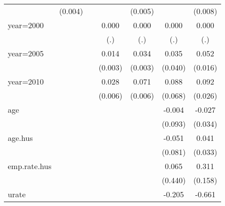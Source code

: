 \begin{table}[htbp]
\begin{tabular}{l*{6}{c}}
                    &     (0.004)         &                     &                     &     (0.005)         &                     &     (0.008)         \\
year=2000           &                     &                     &       0.000         &       0.000         &       0.000         &       0.000         \\
                    &                     &                     &         (.)         &         (.)         &         (.)         &         (.)         \\
year=2005           &                     &                     &       0.014\sym{***}&       0.034\sym{***}&       0.035         &       0.052\sym{**} \\
                    &                     &                     &     (0.003)         &     (0.003)         &     (0.040)         &     (0.016)         \\
year=2010           &                     &                     &       0.028\sym{***}&       0.071\sym{***}&       0.088         &       0.092\sym{**} \\
                    &                     &                     &     (0.006)         &     (0.006)         &     (0.068)         &     (0.026)         \\
age                 &                     &                     &                     &                     &      -0.004         &      -0.027         \\
                    &                     &                     &                     &                     &     (0.093)         &     (0.034)         \\
age.hus             &                     &                     &                     &                     &      -0.051         &       0.041         \\
                    &                     &                     &                     &                     &     (0.081)         &     (0.033)         \\
emp.rate.hus        &                     &                     &                     &                     &       0.065         &       0.311         \\
                    &                     &                     &                     &                     &     (0.440)         &     (0.158)         \\
urate               &                     &                     &                     &                     &      -0.205         &      -0.661\sym{*}  \\

\end{tabular}
\end{table}
